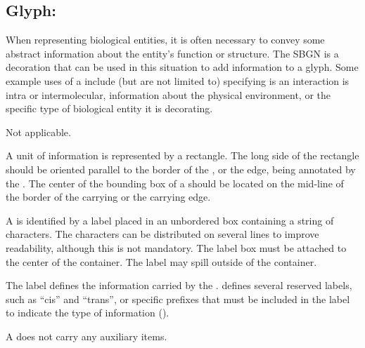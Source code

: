 
\subsection{Glyph: }
\label{sec:unitInformation}

When representing biological entities, it is often necessary to convey some abstract information about the entity's function or structure.  The SBGN  is a decoration that can be used in this situation to add information to a glyph.  Some example uses of a  include (but are not limited to) specifying is an interaction is intra or intermolecular, information about the physical environment, or the specific type of biological entity it is decorating.

\begin{glyphDescription}

\glyphSboTerm Not applicable.

\glyphContainer A unit of information is represented by a rectangle.  The long side of the rectangle should be oriented parallel to the border of the , or the edge, being annotated by the . The center of the bounding box of a  should be located on the mid-line of the border of the carrying  or the carrying edge.

\glyphLabel A  is identified by a label placed in an unbordered box containing a string of characters.  The characters can be distributed on several lines to improve readability, although this is not mandatory.  The label box must be attached to the center of the container.  The label may spill outside of the container.

The label defines the information carried by the .  \SBGNERLone defines several reserved labels, such as ``cis'' and ``trans'', or specific prefixes that must be included in the label to indicate the type of information ().

\glyphAux A  does not carry any auxiliary items.

\end{glyphDescription}


